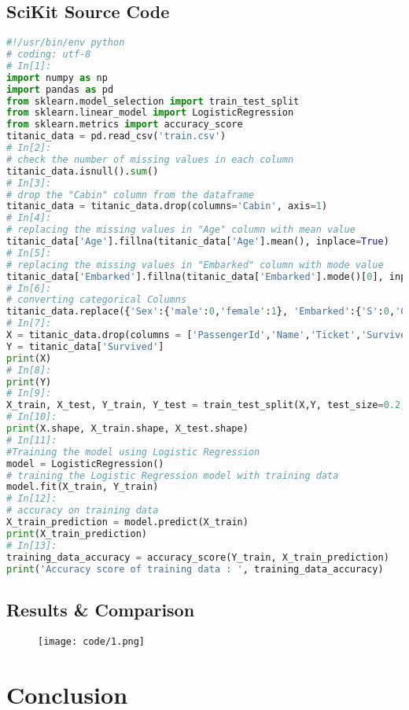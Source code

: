 \documentclass[notitlepage,a4paper,oneside,article,table]{article}
\begin{document}
\subsection{SciKit Source Code}
%
\begin{lstlisting}[language=Python, caption=Code used in book using Titanic dataset]
#!/usr/bin/env python
# coding: utf-8
# In[1]:
import numpy as np
import pandas as pd
from sklearn.model_selection import train_test_split
from sklearn.linear_model import LogisticRegression
from sklearn.metrics import accuracy_score
titanic_data = pd.read_csv('train.csv')
# In[2]:
# check the number of missing values in each column
titanic_data.isnull().sum()
# In[3]:
# drop the "Cabin" column from the dataframe
titanic_data = titanic_data.drop(columns='Cabin', axis=1)
# In[4]:
# replacing the missing values in "Age" column with mean value
titanic_data['Age'].fillna(titanic_data['Age'].mean(), inplace=True)
# In[5]:
# replacing the missing values in "Embarked" column with mode value
titanic_data['Embarked'].fillna(titanic_data['Embarked'].mode()[0], inplace=True)
# In[6]:
# converting categorical Columns
titanic_data.replace({'Sex':{'male':0,'female':1}, 'Embarked':{'S':0,'C':1,'Q':2}}, inplace=True)
# In[7]:
X = titanic_data.drop(columns = ['PassengerId','Name','Ticket','Survived'],axis=1)
Y = titanic_data['Survived']
print(X)
# In[8]:
print(Y)
# In[9]:
X_train, X_test, Y_train, Y_test = train_test_split(X,Y, test_size=0.2, random_state=2)
# In[10]:
print(X.shape, X_train.shape, X_test.shape)
# In[11]:
#Training the model using Logistic Regression
model = LogisticRegression()
# training the Logistic Regression model with training data
model.fit(X_train, Y_train)
# In[12]:
# accuracy on training data
X_train_prediction = model.predict(X_train)
print(X_train_prediction)
# In[13]:
training_data_accuracy = accuracy_score(Y_train, X_train_prediction)
print('Accuracy score of training data : ', training_data_accuracy)
\end{lstlisting}
\subsection{Results \& Comparison}

\begin{figure}[h] %
    \centering
    \texttt{[image: code/1.png]}
\end{figure}
\FloatBarrier


\section{Conclusion}
\end{document}
